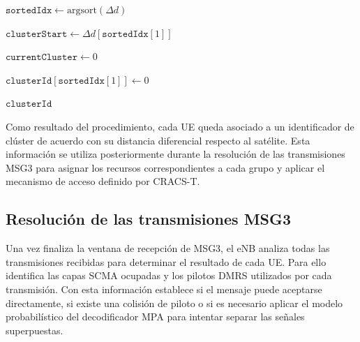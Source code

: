 \begin{algorithm}[H]
\DontPrintSemicolon
\caption{\emph{Clustering} por distancia diferencial}
\label{alg:clustering}


$\mathtt{sortedIdx}\leftarrow\mathrm{argsort}(\Delta d)$\;

$\mathtt{clusterStart}\leftarrow\Delta d[\mathtt{sortedIdx}[1]]$\;

$\mathtt{currentCluster}\leftarrow0$\;

$\mathtt{clusterId}[\mathtt{sortedIdx}[1]]\leftarrow0$\;


\Return $\mathtt{clusterId}$\;

\end{algorithm}

Como resultado del procedimiento, cada UE queda asociado a un identificador de clúster de acuerdo con su distancia diferencial respecto al satélite. Esta información se utiliza posteriormente durante la resolución de las transmisiones MSG3 para asignar los recursos correspondientes a cada grupo y aplicar el mecanismo de acceso definido por CRACS-T.

\subsection{Resolución de las transmisiones MSG3}
\label{sec:impl_decision}

Una vez finaliza la ventana de recepción de MSG3, el eNB analiza todas las transmisiones recibidas para determinar el resultado de cada UE. Para ello identifica las capas SCMA ocupadas y los pilotos DMRS utilizados por cada transmisión. Con esta información establece si el mensaje puede aceptarse directamente, si existe una colisión de piloto o si es necesario aplicar el modelo probabilístico del decodificador MPA para intentar separar las señales superpuestas.

